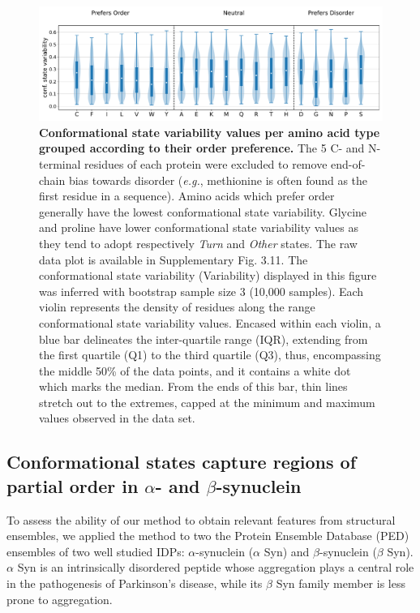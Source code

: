 \begin{figure}[!t]
\centering
\includegraphics[width=\textwidth]{constava/figures_constava/figure6.pdf}
\caption{\textbf{Conformational state variability values per amino acid type grouped according to their order preference.} The 5 C- and N-terminal residues of each protein were excluded to remove end-of-chain bias towards disorder (\textit{e.g.}, methionine is often found as the first residue in a sequence). Amino acids which prefer order generally have the lowest conformational state variability. Glycine and proline have lower conformational state variability values as they tend to adopt respectively \textit{Turn} and \textit{Other} states. The raw data plot is available in Supplementary Fig. 3.11.
The conformational state variability (Variability) displayed in this figure was inferred with bootstrap sample size 3 (10,000 samples). Each violin represents the density of residues along the range conformational state variability values. Encased within each violin, a blue bar delineates the inter-quartile range (IQR), extending from the first quartile (Q1) to the third quartile (Q3), thus, encompassing the middle 50\% of the data points, and it contains a white dot which marks the median. From the ends of this bar, thin lines stretch out to the extremes, capped at the minimum and maximum values observed in the data set.
}\label{fig:conva_per_aa_class}
\end{figure}

\subsection[Conformational states capture regions of partial order in alpha- and beta-synuclein]{Conformational states capture regions of partial order in $\alpha$- and $\beta$-synuclein}

To assess the ability of our method to obtain relevant features from structural ensembles, we applied the method to two the Protein Ensemble Database (PED) ensembles of two well studied IDPs: $\alpha$-synuclein ($\alpha$ Syn) and $\beta$-synuclein ($\beta$ Syn). $\alpha$ Syn is an intrinsically disordered peptide whose aggregation plays a central role in the pathogenesis of Parkinson's disease, while its $\beta$ Syn family member is less prone to aggregation. 

